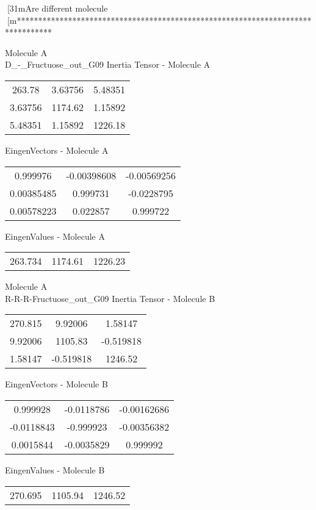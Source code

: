 [31mAre different molecule
[m********************************************************************************
\newpage
\begin{multicols}{2}
\begin{center}
Molecule A \\ 
D_-_Fructuose_out_G09
Inertia Tensor - Molecule A \\
\vtab
\begin{tabular}{|c c c|}
263.78	 & 	3.63756	 & 	5.48351	 \\
3.63756	 & 	1174.62	 & 	1.15892	 \\
5.48351	 & 	1.15892	 & 	1226.18
\end{tabular}

\vtab
 EingenVectors - Molecule A     \\
\vtab
\begin{tabular}{|c c c|}
0.999976	 & 	-0.00398608	 & 	-0.00569256	 \\
0.00385485	 & 	0.999731	 & 	-0.0228795	 \\
0.00578223	 & 	0.022857	 & 	0.999722
\end{tabular}

\vtab
 EingenValues - Molecule A     \\
\vtab
\begin{tabular}{|c c c|}
263.734	 & 	1174.61	 & 	1226.23
\end{tabular}
\columnbreak
Molecule A \\ 
R-R-R-Fructuose_out_G09
Inertia Tensor - Molecule B \\
\vtab
\begin{tabular}{|c c c|}
270.815	 & 	9.92006	 & 	1.58147	 \\
9.92006	 & 	1105.83	 & 	-0.519818	 \\
1.58147	 & 	-0.519818	 & 	1246.52
\end{tabular}

\vtab
 EingenVectors - Molecule B     \\
\vtab
\begin{tabular}{|c c c|}
0.999928	 & 	-0.0118786	 & 	-0.00162686	 \\
-0.0118843	 & 	-0.999923	 & 	-0.00356382	 \\
0.0015844	 & 	-0.0035829	 & 	0.999992
\end{tabular}

\vtab
 EingenValues - Molecule B     \\
\vtab
\begin{tabular}{|c c c|}
270.695	 & 	1105.94	 & 	1246.52
\end{tabular}
\end{center}
\end{multicols}
